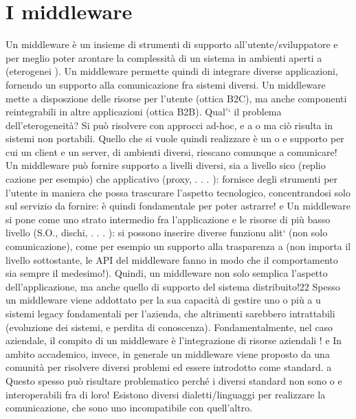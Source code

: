 \documentclass[a4paper,12pt]{article}
\begin{document}
\section{I middleware}
Un middleware è un insieme di strumenti di supporto all'utente/sviluppatore
e
per meglio poter arontare la complessità di un sistema in ambienti aperti
a
(eterogenei ). Un middleware permette quindi di integrare diverse applicazioni,
fornendo un supporto alla comunicazione fra sistemi diversi.
Un middleware mette a disposzione delle risorse per l'utente (ottica B2C),
ma anche componenti reintegrabili in altre applicazioni (ottica B2B).
Qual'` il problema dell'eterogeneità? Si può risolvere con approcci ad-hoc,
e
a
o
ma ciò risulta in sistemi non portabili. Quello che si vuole quindi realizzare è un
o
e
supporto per cui un client e un server, di ambienti diversi, riescano comunque
a comunicare!
Un middleware può fornire supporto a livelli diversi, sia a livello sico (replio
cazione per esempio) che applicativo (proxy, . . . ): fornisce degli strumenti per
l'utente in maniera che possa trascurare l'aspetto tecnologico, concentrandosi
solo sul servizio da fornire: è quindi fondamentale per poter astrarre!
e
Un middleware si pone come uno strato intermedio fra l'applicazione e le
risorse di più basso livello (S.O., dischi, . . . ): si possono inserire diverse funzionu
alit` (non solo comunicazione), come per esempio un supporto alla trasparenza
a
(non importa il livello sottostante, le API del middleware fanno in modo che
il comportamento sia sempre il medesimo!). Quindi, un middleware non solo
semplica l'aspetto dell'applicazione, ma anche quello di supporto del sistema
distribuito!22
Spesso un middleware viene addottato per la sua capacità di gestire uno o più
a
u
sistemi legacy fondamentali per l'azienda, che altrimenti sarebbero intrattabili
(evoluzione dei sistemi, e perdita di conoscenza). Fondamentalmente, nel caso
aziendale, il compito di un middleware è l'integrazione di risorse aziendali !
e
In ambito accademico, invece, in generale un middleware viene proposto da
una comunità per risolvere diversi problemi ed essere introdotto come standard.
a
Questo spesso può risultare problematico perché i diversi standard non sono
o
e
interoperabili fra di loro! Esistono diversi dialetti/linguaggi per realizzare la
comunicazione, che sono uno incompatibile con quell'altro.
\end{document}
